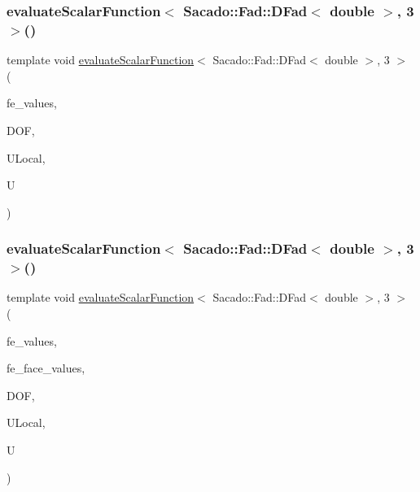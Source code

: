 \mbox{\label{function_evaluations_8cc_a57853d187be6c5f0a186e6ba62f141d6}} 
\subsubsection{\texorpdfstring{evaluateScalarFunction$<$ Sacado::Fad::DFad$<$ double $>$, 3 $>$()}{evaluateScalarFunction< Sacado::Fad::DFad< double >, 3 >()}\hspace{0.1cm}{\footnotesize\ttfamily [1/2]}}
{\footnotesize\ttfamily template void \mbox{\hyperlink{group___evaluation_functions_ga2e2fbeb2173113c6889c73bbb7304789}{evaluate\+Scalar\+Function}}$<$ Sacado\+::\+Fad\+::\+D\+Fad$<$ double $>$, 3 $>$ (\begin{DoxyParamCaption}\item[{const F\+E\+Values$<$ 3 $>$ \&}]{fe\+\_\+values,  }\item[{unsigned int}]{D\+OF,  }\item[{Table$<$ 1, Sacado\+::\+Fad\+::\+D\+Fad$<$ double $>$$>$ \&}]{U\+Local,  }\item[{Table$<$ 1, Sacado\+::\+Fad\+::\+D\+Fad$<$ double $>$$>$ \&}]{U }\end{DoxyParamCaption})}

\mbox{\label{function_evaluations_8cc_aff733718e441e77597fb5f7369b962d7}} 
\subsubsection{\texorpdfstring{evaluateScalarFunction$<$ Sacado::Fad::DFad$<$ double $>$, 3 $>$()}{evaluateScalarFunction< Sacado::Fad::DFad< double >, 3 >()}\hspace{0.1cm}{\footnotesize\ttfamily [2/2]}}
{\footnotesize\ttfamily template void \mbox{\hyperlink{group___evaluation_functions_ga2e2fbeb2173113c6889c73bbb7304789}{evaluate\+Scalar\+Function}}$<$ Sacado\+::\+Fad\+::\+D\+Fad$<$ double $>$, 3 $>$ (\begin{DoxyParamCaption}\item[{const F\+E\+Values$<$ 3 $>$ \&}]{fe\+\_\+values,  }\item[{const F\+E\+Face\+Values$<$ 3 $>$ \&}]{fe\+\_\+face\+\_\+values,  }\item[{unsigned int}]{D\+OF,  }\item[{Table$<$ 1, Sacado\+::\+Fad\+::\+D\+Fad$<$ double $>$$>$ \&}]{U\+Local,  }\item[{Table$<$ 1, Sacado\+::\+Fad\+::\+D\+Fad$<$ double $>$$>$ \&}]{U }\end{DoxyParamCaption})}

